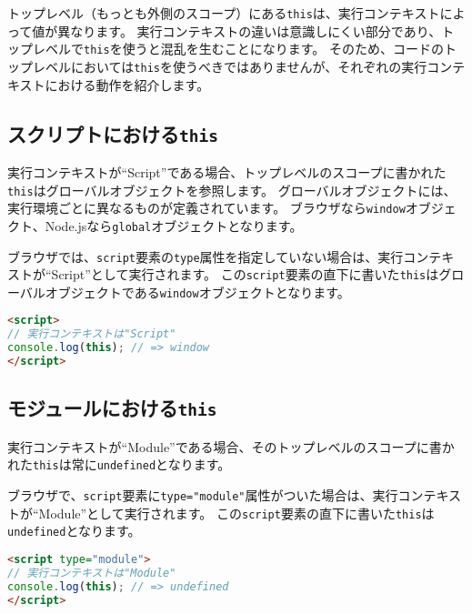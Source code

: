 トップレベル（もっとも外側のスコープ）にある\texttt{this}は、実行コンテキストによって値が異なります。
実行コンテキストの違いは意識しにくい部分であり、トップレベルで\texttt{this}を使うと混乱を生むことになります。
そのため、コードのトップレベルにおいては\texttt{this}を使うべきではありませんが、それぞれの実行コンテキストにおける動作を紹介します。

\hypertarget{script-this}{%
\subsection{\texorpdfstring{スクリプトにおける\texttt{this}}{スクリプトにおけるthis}}\label{script-this}}

実行コンテキストが``Script''である場合、トップレベルのスコープに書かれた\texttt{this}はグローバルオブジェクトを参照します。
グローバルオブジェクトには、実行環境ごとに異なるものが定義されています。
ブラウザなら\texttt{window}オブジェクト、Node.jsなら\texttt{global}オブジェクトとなります。

ブラウザでは、\texttt{script}要素の\texttt{type}属性を指定していない場合は、実行コンテキストが``Script''として実行されます。
この\texttt{script}要素の直下に書いた\texttt{this}はグローバルオブジェクトである\texttt{window}オブジェクトとなります。

\begin{lstlisting}[language=HTML]
<script>
// 実行コンテキストは"Script"
console.log(this); // => window
</script>
\end{lstlisting}

\hypertarget{module-this}{%
\subsection{\texorpdfstring{モジュールにおける\texttt{this}}{モジュールにおけるthis}}\label{module-this}}

実行コンテキストが``Module''である場合、そのトップレベルのスコープに書かれた\texttt{this}は常に\texttt{undefined}となります。

ブラウザで、\texttt{script}要素に\texttt{type="module"}属性がついた場合は、実行コンテキストが``Module''として実行されます。
この\texttt{script}要素の直下に書いた\texttt{this}は\texttt{undefined}となります。

\begin{lstlisting}[language=HTML]
<script type="module">
// 実行コンテキストは"Module"
console.log(this); // => undefined
</script>
\end{lstlisting}

